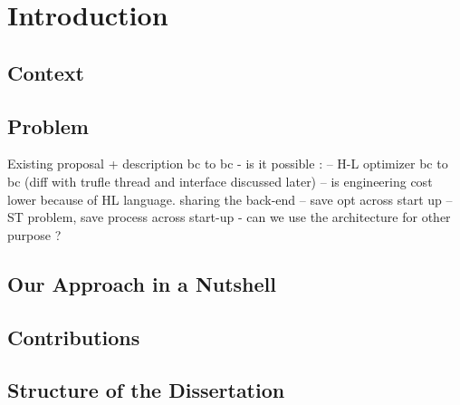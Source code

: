 \documentclass[a4paper,12pt,twoside]{../includes/ThesisStyle}
\begin{document}
\fi

\chapter{Introduction }
\label{chap:intro}
\minitoc

\section{Context}

\section{Problem}

Existing proposal + description bc to bc
- is it possible :
-- H-L optimizer bc to bc (diff with trufle thread and interface discussed later)
-- is engineering cost lower because of HL language. sharing the back-end
-- save opt across start up
-- ST problem, save process across start-up
- can we use the architecture for other purpose ?


\section{Our Approach in a Nutshell}

\section{Contributions}

\section{Structure of the Dissertation}


\ifx\wholebook\relax\else
    
\end{document}
